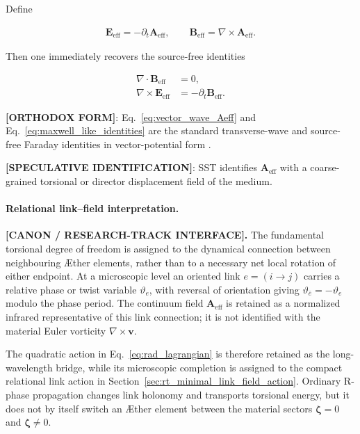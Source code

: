 \documentclass[11pt]{article}
\theoremstyle{definition}
\theoremstyle{plain}
\theoremstyle{remark}
\begin{document}
        Define

        \begin{align}
            \mathbf{E}_{\mathrm{eff}} = -\partial_t \mathbf{A}_{\mathrm{eff}},
            \qquad
            \mathbf{B}_{\mathrm{eff}} = \nabla\times \mathbf{A}_{\mathrm{eff}}.
            \label{eq:effective_em_fields}
        \end{align}

        Then one immediately recovers the source-free identities

        \begin{align}
            \nabla\cdot \mathbf{B}_{\mathrm{eff}} &= 0, \\
            \nabla\times \mathbf{E}_{\mathrm{eff}} &= -\partial_t \mathbf{B}_{\mathrm{eff}}.
            \label{eq:maxwell_like_identities}
        \end{align}

        \textbf{[ORTHODOX FORM]}: Eq.~\eqref{eq:vector_wave_Aeff} and Eq.~\eqref{eq:maxwell_like_identities} are the standard transverse-wave and source-free Faraday identities in vector-potential form \cite{Jackson1999}.

        \textbf{[SPECULATIVE IDENTIFICATION]}: SST identifies $\mathbf{A}_{\mathrm{eff}}$ with a coarse-grained torsional or director displacement field of the medium.


        \paragraph{Relational link--field interpretation.}
        \textbf{[CANON / RESEARCH-TRACK INTERFACE].}
        The fundamental torsional degree of freedom is assigned to the dynamical
        connection between neighbouring \AE ther elements, rather than to a
        necessary net local rotation of either endpoint.  At a microscopic level
        an oriented link $e=(i\!\to\!j)$ carries a relative phase or twist variable
        $\vartheta_e$, with reversal of orientation giving
        $\vartheta_{\bar e}=-\vartheta_e$ modulo the phase period.  The continuum
        field $\mathbf A_{\mathrm{eff}}$ is retained as a normalized infrared
        representative of this link connection; it is not identified with the
        material Euler vorticity $\nabla\times\mathbf v$.

        The quadratic action in Eq.~\eqref{eq:rad_lagrangian} is therefore retained
        as the long-wavelength bridge, while its microscopic completion is assigned
        to the compact relational link action in
        Section~\ref{sec:rt_minimal_link_field_action}.  Ordinary R-phase
        propagation changes link holonomy and transports torsional energy, but it
        does not by itself switch an \AE ther element between the material sectors
        $\boldsymbol\zeta=0$ and $\boldsymbol\zeta\neq0$.
\end{document}
